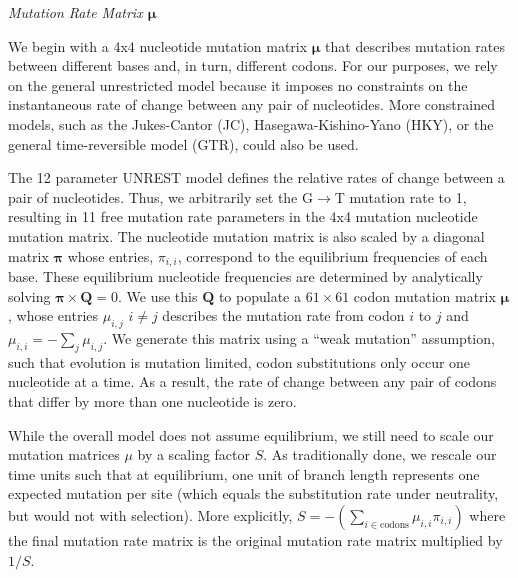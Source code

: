\documentclass[12pt,letterpaper,fleqn]{article}
\renewcommand{\subsection}[1]{%
\bigskip
\begin{center}
\begin{large}
\normalfont\itshape #1
\end{large}
\end{center}}
\newcommand{\pimatrix}{\ensuremath{\boldsymbol{\pi}}\xspace}
\newcommand{\mumatrix}{\ensuremath{\boldsymbol{\mu}}\xspace}
\newcommand{\Qmatrix}{\ensuremath{\mathbf{Q}}\xspace}
\newcommand{\muij}{\ensuremath{\mu_{i,j}}\xspace}
\begin{document}
\subsection{Mutation Rate Matrix \mumatrix}
We begin with a 4x4 nucleotide mutation matrix \mumatrix that describes mutation rates between different bases and, in turn, different codons.
For our purposes, we rely on the general unrestricted model \citep[UNREST from ][]{Yang1994} because it imposes no constraints on the instantaneous rate of change between any pair of nucleotides.
More constrained models, such as the Jukes-Cantor (JC), Hasegawa-Kishino-Yano (HKY), or the general time-reversible model (GTR), could also be used.

The 12 parameter UNREST model defines the relative rates of change between a pair of nucleotides.
Thus, we arbitrarily set the G$\rightarrow$T mutation rate to 1, resulting in 11 free mutation rate parameters in the 4x4 mutation nucleotide mutation matrix.
The nucleotide mutation matrix is also scaled by a diagonal matrix \pimatrix whose entries, $\pi_{i,i}$, correspond to the equilibrium frequencies of each base.
These equilibrium nucleotide frequencies are determined by analytically solving $\pimatrix \times \Qmatrix = 0$.
We use this \Qmatrix to populate a $61 \times 61$ codon mutation matrix $\mumatrix$, whose entries $\muij$ $i\neq j$ describes the mutation rate from codon $i$ to $j$ and $\mu_{i,i} = - \sum_j \mu_{i,j}$.
We generate this matrix using a ``weak mutation'' assumption, such that evolution is mutation limited, codon substitutions only occur one nucleotide at a time.
As a result, the rate of change between any pair of codons that differ by more than one nucleotide is zero.

While the overall model does not assume equilibrium, we still need to scale our mutation matrices $\mu$ by a scaling factor $S$.
As traditionally done, we rescale our time units such that at equilibrium, one unit of branch length represents one expected mutation per site (which equals the substitution rate under neutrality, but would not with selection).
More explicitly, $ S = -\left(\sum_{i \in \text{codons}} \mu_{i,i} \pi_{i,i}\right)$ where the final mutation rate matrix is the original mutation rate matrix multiplied by $1/S$.
\end{document}
